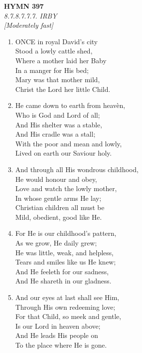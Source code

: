\newpage
\begin{center}
    {\Large \textbf{HYMN 397}}
    \\
    \textit{8.7.8.7.7.7. IRBY}
    \\
    \textit{\small [Moderately fast]}
\end{center}
\vspace{1em}

\begin{enumerate}
    \item ONCE in royal David's city \\
        Stood a lowly cattle shed, \\
        Where a mother laid her Baby \\
        In a manger for His bed; \\
        Mary was that mother mild, \\
        Christ the Lord her little Child.

    \item He came down to earth from heav\`en, \\
        Who is God and Lord of all; \\
        And His shelter was a stable, \\
        And His cradle was a stall; \\
        With the poor and mean and lowly, \\
        Lived on earth our Saviour holy.

    \item And through all His wondrous childhood, \\
        He would honour and obey, \\
        Love and watch the lowly mother, \\
        In whose gentle arms He lay; \\
        Christian children all must be \\
        Mild, obedient, good like He.

    \item For He is our childhood's pattern, \\
        As we grow, He daily grew; \\
        He was little, weak, and helpless, \\
        Tears and smiles like us He knew; \\
        And He feeleth for our sadness, \\
        And He shareth in our gladness.

    \item And our eyes at last shall see Him, \\
        Through His own redeeming love; \\
        For that Child, so meek and gentle, \\
        Is our Lord in heaven above; \\
        And He leads His people on \\
        To the place where He is gone.


\end{enumerate}
